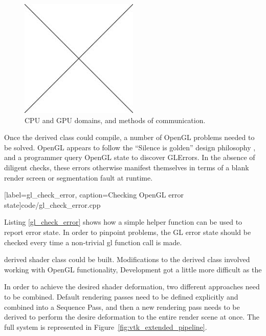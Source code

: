 \documentclass[MSc,paper=a4,pagesize=auto]{icldt}
\begin{document}
\begin{figure}[htbp!]
    \centering
    \includegraphics[width=0.5\textwidth]{resources/placeholder}
    \caption{CPU and GPU domains, and methods of communication.}
    \label{fig:cpu_gpu_domains}
\end{figure}

Once the derived class could compile, a number of OpenGL problems needed to be solved. OpenGL appears to follow the ``Silence is golden'' design philosophy \cite{the_art_of_unix_programming}, and a programmer query OpenGL state to discover GLErrors. In the absence of diligent checks, these errors otherwise manifest themselves in terms of a blank render screen or segmentation fault at runtime. 


  [label=gl_check_error, caption=Checking OpenGL error state]{code/gl_check_error.cpp}

Listing \ref{gl_check_error} shows how a simple helper function can be used to report error state. In order to pinpoint problems, the GL error state should be checked every time a non-trivial gl function call is made.





derived shader class could be built. Modifications to the derived class involved working with OpenGL functionality,  Development got a little more difficult as the 




In order to achieve the desired shader deformation, two different approaches need to be combined. Default rendering passes need to be defined explicitly and combined into a Sequence Pass, and then a new rendering pass needs to be derived to perform the desire deformation to the entire render scene at once. The full system is represented in Figure~\ref{fig:vtk_extended_pipeline}.
\end{document}
